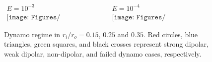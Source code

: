 \begin{figure}
\begin{center}
\[
\begin{array}{cc}
\mbox{$E = 10^{-3}$} &
\mbox{$E = 10^{-4}$} \\
\texttt{[image: Figures/ratio\_rac\_VS\_aspect\_Ek3.pdf]} &
\texttt{[image: Figures/ratio\_rac\_VS\_aspect\_Ek4.pdf]}
\end{array}
\]
\end{center}
\caption{
Dynamo regime in $r_{i} / r_{o} = 0.15$, $0.25$ and $0.35$. Red circles, blue triangles, green squares, and black crosses represent strong dipolar, weak dipolar, non-dipolar, and failed dynamo cases, respectively.
}
\label{fig:dynamo_summary}
\end{figure}